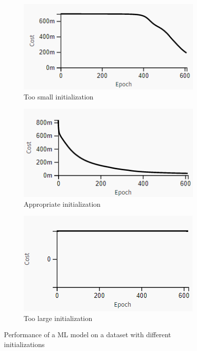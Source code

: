 \begin{figure}{}
	\centering
	
	\begin{subfigure}[b]{.30\linewidth}{}
		\includegraphics[keepaspectratio = True, scale = 0.40]{figures/small.png}
		\centering
		\caption{Too small initialization}
		\vspace{2.0em}
		\label{fig:sml}
	\end{subfigure}
	\begin{subfigure}[b]{.30\linewidth}
		\includegraphics[keepaspectratio = True, scale = 0.40]{figures/apr.png}
		\caption{Appropriate initialization}
		\vspace{2.0em}
		\label{fig:apr}
	\end{subfigure}
	\begin{subfigure}[b]{.30\linewidth}
		\includegraphics[keepaspectratio = True, scale = 0.40]{figures/lrg.png}
		\caption{Too large initialization}
		\vspace{2.0em}
		\label{fig:lrg}
	\end{subfigure}

	
	\caption{Performance of a ML model on a dataset with different initializations}
	\label{fig:results}
\end{figure}

